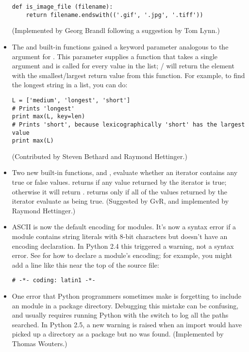 \documentclass{howto}
\begin{document}
\begin{itemize}
\begin{verbatim}
def is_image_file (filename):
    return filename.endswith(('.gif', '.jpg', '.tiff'))
\end{verbatim}

(Implemented by Georg Brandl following a suggestion by Tom Lynn.)

\item The  and  built-in functions
gained a  keyword parameter analogous to the 
argument for .  This parameter supplies a function that
takes a single argument and is called for every value in the list;
/ will return the element with the 
smallest/largest return value from this function.
For example, to find the longest string in a list, you can do:

\begin{verbatim}
L = ['medium', 'longest', 'short']
# Prints 'longest'
print max(L, key=len)              
# Prints 'short', because lexicographically 'short' has the largest value
print max(L)         
\end{verbatim}

(Contributed by Steven Bethard and Raymond Hettinger.)

\item Two new built-in functions,  and
, evaluate whether an iterator contains any true or
false values.   returns  if any value
returned by the iterator is true; otherwise it will return
.   returns  only if
all of the values returned by the iterator evaluate as being true.
(Suggested by GvR, and implemented by Raymond Hettinger.)

\item ASCII is now the default encoding for modules.  It's now 
a syntax error if a module contains string literals with 8-bit
characters but doesn't have an encoding declaration.  In Python 2.4
this triggered a warning, not a syntax error.  See  
for how to declare a module's encoding; for example, you might add 
a line like this near the top of the source file:

\begin{verbatim}
# -*- coding: latin1 -*-
\end{verbatim}

\item One error that Python programmers sometimes make is forgetting
to include an  module in a package directory.
Debugging this mistake can be confusing, and usually requires running
Python with the  switch to log all the paths searched.
In Python 2.5, a new  warning is raised when
an import would have picked up a directory as a package but no
 was found.  (Implemented by Thomas Wouters.)


\end{itemize}
\end{document}
